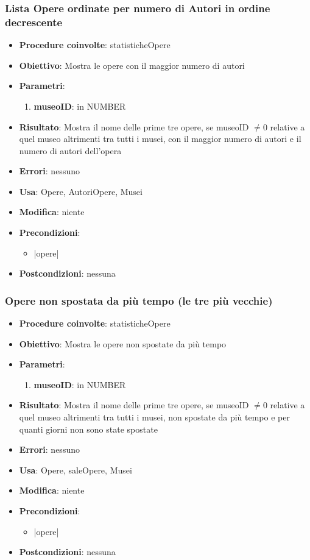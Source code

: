 \subsubsection{Lista Opere ordinate per numero di Autori in ordine decrescente}
\begin{itemize}
	\item \textbf{Procedure coinvolte}: statisticheOpere
	\item \textbf{Obiettivo}: Mostra le opere con il maggior numero di autori
	\item \textbf{Parametri}:
	\begin{enumerate}
		\item \textbf{museoID}: in NUMBER
	\end{enumerate}
	\item \textbf{Risultato}: Mostra il nome delle prime tre opere, se museoID $\neq 0$ relative a quel museo altrimenti tra tutti i musei, con il maggior numero di autori e il numero di autori dell'opera
	\item \textbf{Errori}: nessuno
	\item \textbf{Usa}: Opere, AutoriOpere, Musei
	\item \textbf{Modifica}: niente
	\item \textbf{Precondizioni}:
	\begin{itemize}
		\item |opere| 
	\end{itemize}
	\item \textbf{Postcondizioni}: nessuna
\end{itemize}

\subsubsection{Opere non spostata da più tempo (le tre più vecchie)}
\begin{itemize}
	\item \textbf{Procedure coinvolte}: statisticheOpere
	\item \textbf{Obiettivo}: Mostra le opere non spostate da più tempo
	\item \textbf{Parametri}:
	\begin{enumerate}
		\item \textbf{museoID}: in NUMBER
	\end{enumerate}
	\item \textbf{Risultato}: Mostra il nome delle prime tre opere, se museoID $\neq 0$ relative a quel museo altrimenti tra tutti i musei, non spostate da più tempo e per quanti giorni non sono state spostate
	\item \textbf{Errori}: nessuno
	\item \textbf{Usa}: Opere, saleOpere, Musei
	\item \textbf{Modifica}: niente
	\item \textbf{Precondizioni}:
	\begin{itemize}
		\item |opere| 
	\end{itemize}
	\item \textbf{Postcondizioni}: nessuna
\end{itemize}

